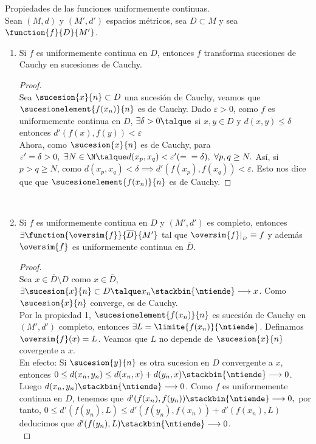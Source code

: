 	\begin{proposicion} Propiedades de las funciones uniformemente continuas.\\
	Sean $(M,d)$ y $(M',d')$ espacios métricos, sea $D\subset M$ y sea $\function{f}{D}{M'}$.
	\begin{enumerate} [1)]
	\item Si $f$ es uniformemente continua en $D$, entonces $f$ transforma sucesiones de Cauchy en sucesiones de Cauchy.
		\begin{proof}\ \\
		Sea $\sucesion{x}{n}\subset D$ una sucesión de Cauchy, veamos que $\sucesionelement{f(x_n)}{n}$ es de Cauchy. Dado $\varepsilon>0$, como $f$ es uniformemente continua en $D$, $\exists\delta>0\talque$ si $x,y\in D$ y $d(x,y)\leq\delta$ entonces $d'(f(x),f(y))<\varepsilon$\\
		Ahora, como $\sucesion{x}{n}$ es de Cauchy, para $\varepsilon'=\delta>0,\ \exists N\in\N\talque d(x_p,x_q)<\varepsilon'(=\\=\delta),\ \forall p,q \geq N.$ Así, si $p>q\geq N$, como $d(x_p,x_q)<\delta\implies d'(f(x_p),f(x_q))<\varepsilon$. Esto nos dice que que $\sucesionelement{f(x_n)}{n}$ es de Cauchy.
		\end{proof}\ \\
	\item Si $f$ es uniformemente continua en $D$ y $(M',d')$ es completo, entonces $\exists \function{\oversim{f}}{\overline{D}}{M'}$ tal que $\oversim{f}|_{_D}\equiv f$ y además $\oversim{f}$ es uniformemente continua en $\overline{D}$.
	\begin{proof}\ \\
	Sea $x\in \overline{D}\setminus D$ como $x\in \overline{D}$, $\exists\sucesion{x}{n}\subset D\talque x_n\stackbin{\ntiende}\longrightarrow x$. Como $\sucesion{x}{n}$ converge, es de Cauchy.\\
	Por la propiedad 1, $\sucesionelement{f(x_n)}{n}$ es sucesión de Cauchy en $(M',d')$ completo, entonces $\exists L=\limite{f(x_n)}{\ntiende}$. Definamos $\oversim{f}(x)=L$. Veamos que $L$ no depende de $\sucesion{x}{n}$ covergente a $x$.\\
	En efecto: Si $\sucesion{y}{n}$ es otra sucesion en $D$ convergente a $x$, entonces $0\leq d(x_n,y_n)\leq d(x_n,x)+ d(y_n,x)\stackbin{\ntiende}\longrightarrow 0$. Luego $d(x_n,y_n)\stackbin{\ntiende}\longrightarrow 0$. Como $f$ es uniformemente continua en $D$, tenemos que $d'(f(x_n),f(y_n))\stackbin{\ntiende}\longrightarrow 0,$ por tanto, $0\leq d'(f(y_n),L)\leq d'(f(y_n),f(x_n))+d'(f(x_n),L)$ deducimos que $d'(f(y_n),L)\stackbin{\ntiende}\longrightarrow 0$.\\

\end{proof}
\end{enumerate}
\end{proposicion}
